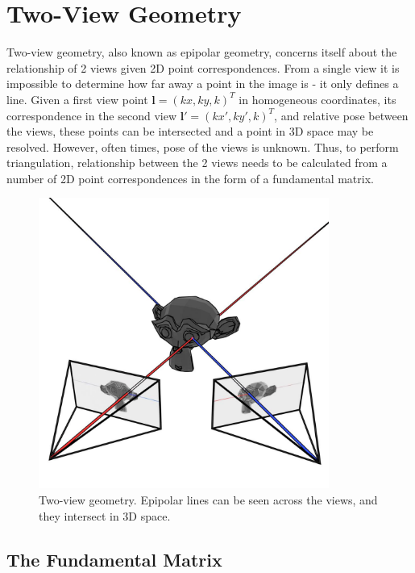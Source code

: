 \documentclass[11pt,english]{report}
\begin{document}
\section{Two-View Geometry}

Two-view geometry, also known as epipolar geometry, concerns itself about the relationship of 2 views given 2D point correspondences. From a single view it is impossible to determine how far away a point in the image is - it only defines a line. Given a first view point $\mathbf{l} = (kx, ky, k)^T$ in homogeneous coordinates, its correspondence in the second view $\mathbf{l}' = (kx', ky', k)^T$, and relative pose between the views, these points can be intersected and a point in 3D space may be resolved. However, often times, pose of the views is unknown. Thus, to perform triangulation, relationship between the 2 views needs to be calculated from a number of 2D point correspondences in the form of a fundamental matrix.

\begin{figure}[!ht]
	\centering
	\includegraphics[width=270pt]{docs/report/epipolar-geometry.jpg}
	\caption{\centering Two-view geometry. Epipolar lines can be seen across the views, and they intersect in 3D space.}
\end{figure}

\subsection{The Fundamental Matrix}
\end{document}
